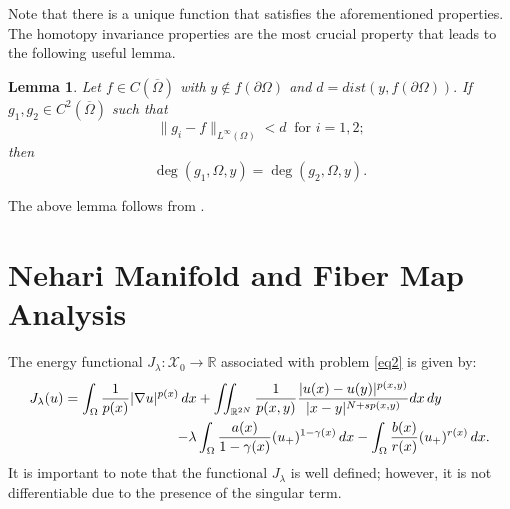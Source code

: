 \documentclass[11pt]{article}
\newtheorem{lemma}{Lemma}[section] %
\newcommand{\X}{\mathcal{X}_{0}}
\newcommand{\ga} {\gamma}
\newcommand{\om} {\Omega}
\newcommand{\la} {\lambda}
\newcommand{\real}{\mathbb{R}}
\newcommand{\lv}{\lVert}
\newcommand{\rv}{\rVert}
\newcommand{\grad}{\nabla}
\begin{document}
Note that there is a unique function 
that satisfies the aforementioned properties.
The homotopy invariance properties are 
the most crucial property that leads 
to the following useful lemma. 

\begin{lemma}\label{lem:equal_degree}
Let $f \in C(\overline{\om})$
with $y \not \in f(\partial \om)$
and $d = dist(y, f(\partial \om)).$
If $g_1, g_2 \in C^{2}(\overline{\om})$
such that 
$$
\lv g_i - f\rv_{L^{\infty}(\om)} < d 
\ \text{ for $i = 1,2$;}
$$
 then 
$$
 \deg(g_1, \om,y) = \deg(g_2, \om,y) .
 $$
\end{lemma}

 The above lemma follows from
\cite[Proposition $2.4$]{deimling_degree_theory}.

 
\section{Nehari Manifold and Fiber Map Analysis}\label{sec2}

The energy functional $J_{\lambda}: \X \to \real$
associated with problem \eqref{eq2} is given by:
\begin{align}\label{eq:eneryg_functional}
J_\la(u)=
\int_\om 
\frac{1}{p(x)}|\grad u|^{p(x)}\,dx
&+\iint_{\mathbb{R}^{2N}} 
\frac{1}{p(x,y)}
\frac{|u(x)-u(y)|^{p(x,y)}}{|x-y|^{N+sp(x,y)}}dx \, dy \\ \notag
-\la&
\int_\om 
\frac{a(x)}{1-\ga(x)}(u_+)^{1-\ga(x)}\,dx-
\int_\om 
\frac{b(x)}{r(x)}(u_+)^{r(x)}\,dx.
\end{align}
It is important to note that the functional $J_\la$
is well defined; however, it is not 
differentiable due to the presence of the singular term.
\end{document}
